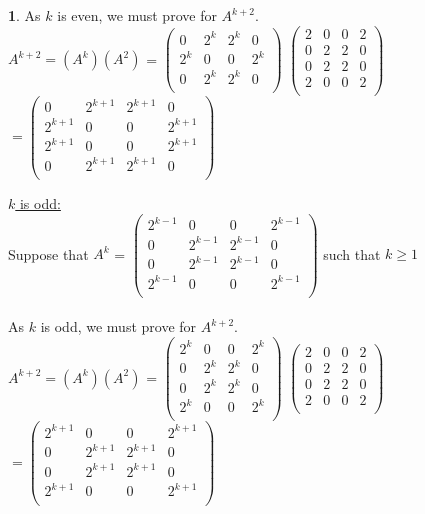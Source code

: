 \documentclass[12pt,a4paper]{article}
\theoremstyle{definition}
\newtheorem{problem}{}
\begin{document}
\begin{problem}
As $k$ is even, we must prove for $A^{k + 2}$. \\

$A^{k + 2} = (A^k)(A^2)$ =
$\begin{pmatrix}
    0&2^k&2^k&0\\
    2^k&0&0&2^k\\
    0&2^k&2^k&0\\
\end{pmatrix}$
$\begin{pmatrix}
    2&0&0&2\\
    0&2&2&0\\
    0&2&2&0\\
    2&0&0&2\\
\end{pmatrix}$
$= \begin{pmatrix}
    0&2^{k + 1}&2^{k + 1}&0\\
    2^{k + 1}&0&0&2^{k + 1}\\
    2^{k + 1}&0&0&2^{k + 1}\\
    0&2^{k + 1}&2^{k + 1}&0\\
\end{pmatrix}$

\underline{$k$ is odd:} \\
Suppose that $A^k$ = $\begin{pmatrix}
    2^{k - 1}&0&0&2^{k - 1}\\
    0&2^{k - 1}&2^{k - 1}&0\\
    0&2^{k - 1}&2^{k - 1}&0\\
    2^{k - 1}&0&0&2^{k - 1}\\
\end{pmatrix}$  such that $k \geq 1$ \\\\

As $k$ is odd, we must prove for $A^{k + 2}$. \\

$A^{k + 2} = (A^k)(A^2)$ =
$\begin{pmatrix}
    2^k&0&0&2^k\\
    0&2^k&2^k&0\\
    0&2^k&2^k&0\\
    2^k&0&0&2^k\\
\end{pmatrix}$
$\begin{pmatrix}
    2&0&0&2\\
    0&2&2&0\\
    0&2&2&0\\
    2&0&0&2\\
\end{pmatrix}$
$= \begin{pmatrix}
    2^{k + 1}&0&0&2^{k + 1}\\
    0&2^{k + 1}&2^{k + 1}&0\\
    0&2^{k + 1}&2^{k + 1}&0\\
    2^{k + 1}&0&0&2^{k + 1}\\
\end{pmatrix}$

\end{problem}
\end{document}
